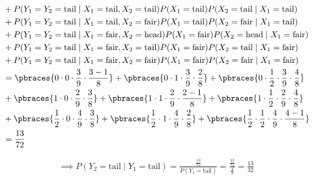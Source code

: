\begin{solution}
\begin{enumerate}[label = (\alph*)]
\begin{align*}
        & +
        P(Y_1 = Y_2 = \mathrm{tail} \mid X_1 = \mathrm{tail}, X_2 = \mathrm{tail}) P(X_1 = \mathrm{tail}) P(X_2 = \mathrm{tail} \mid X_1 = \mathrm{tail}) \\
        & +
        P(Y_1 = Y_2 = \mathrm{tail} \mid X_1 = \mathrm{tail}, X_2 = \mathrm{fair}) P(X_1 = \mathrm{tail}) P(X_2 = \mathrm{fair} \mid X_1 = \mathrm{tail}) \\
        & +
        P(Y_1 = Y_2 = \mathrm{tail} \mid X_1 = \mathrm{fair}, X_2 = \mathrm{head}) P(X_1 = \mathrm{fair}) P(X_2 = \mathrm{head} \mid X_1 = \mathrm{fair}) \\
        & +
        P(Y_1 = Y_2 = \mathrm{tail} \mid X_1 = \mathrm{fair}, X_2 = \mathrm{tail}) P(X_1 = \mathrm{fair}) P(X_2 = \mathrm{tail} \mid X_1 = \mathrm{fair}) \\
        & +
        P(Y_1 = Y_2 = \mathrm{tail} \mid X_1 = \mathrm{fair}, X_2 = \mathrm{fair}) P(X_1 = \mathrm{fair}) P(X_2 = \mathrm{fair} \mid X_1 = \mathrm{fair}) \\
        & =
        \pbraces{0           \cdot 0           \cdot \frac{3}{9} \cdot \frac{3 - 1}{8}}
        +
        \pbraces{0           \cdot 1           \cdot \frac{3}{9} \cdot \frac{2}{8}}
        +
        \pbraces{0           \cdot \frac{1}{2} \cdot \frac{3}{9} \cdot \frac{4}{8}} \\
        &
        +
        \pbraces{1           \cdot 0           \cdot \frac{2}{9} \cdot \frac{3}{8}}
        +
        \pbraces{1           \cdot 1           \cdot \frac{2}{9} \cdot \frac{2 - 1}{8}}
        +
        \pbraces{1           \cdot \frac{1}{2} \cdot \frac{2}{9} \cdot \frac{4}{8}} \\
        &
        +
        \pbraces{\frac{1}{2} \cdot 0           \cdot \frac{4}{9} \cdot \frac{3}{8}}
        +
        \pbraces{\frac{1}{2} \cdot 1           \cdot \frac{4}{9} \cdot \frac{2}{8}}
        +
        \pbraces{\frac{1}{2} \cdot \frac{1}{2} \cdot \frac{4}{9} \cdot \frac{4 - 1}{8}} \\
        & =
        \frac{13}{72}
    \end{align*}

    \begin{align*}
        \implies
        P(Y_2 = \mathrm{tail} \mid Y_1 = \mathrm{tail})
        =
        \frac{\frac{13}{72}}{P(Y_1 = \mathrm{tail})}
        =
        \frac{\frac{13}{72}}{\frac{4}{9}}
        =
        \frac{13}{32}
    \end{align*}

\end{enumerate}

\end{solution}

